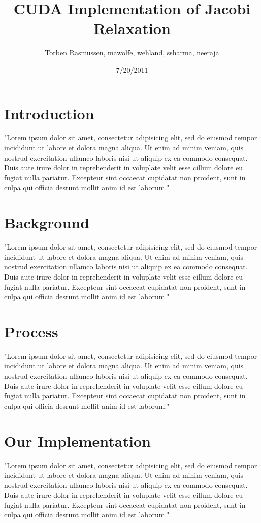 \documentclass[11pt, twocolumn]{article}
\title{CUDA Implementation of Jacobi Relaxation}
\author{Torben Rasmussen, mawolfe, wehland, ssharma, neeraja}
\date{7/20/2011}
\begin{document}
\maketitle

\section{Introduction}
"Lorem ipsum dolor sit amet, consectetur adipisicing elit, sed do eiusmod tempor incididunt ut labore et dolora magna aliqua.  Ut enim ad minim veniam, quis nostrud exercitation ullamco laboris nisi ut aliquip ex ea commodo consequat.  Duis aute irure dolor in reprehenderit in voluplate velit esse cillum dolore eu fugiat nulla pariatur.  Excepteur sint occaecat cupidatat non proident, sunt in culpa qui officia desrunt mollit anim id est laborum."

\section{Background}
"Lorem ipsum dolor sit amet, consectetur adipisicing elit, sed do eiusmod tempor incididunt ut labore et dolora magna aliqua.  Ut enim ad minim veniam, quis nostrud exercitation ullamco laboris nisi ut aliquip ex ea commodo consequat.  Duis aute irure dolor in reprehenderit in voluplate velit esse cillum dolore eu fugiat nulla pariatur.  Excepteur sint occaecat cupidatat non proident, sunt in culpa qui officia desrunt mollit anim id est laborum."

\section{Process}
"Lorem ipsum dolor sit amet, consectetur adipisicing elit, sed do eiusmod tempor incididunt ut labore et dolora magna aliqua.  Ut enim ad minim veniam, quis nostrud exercitation ullamco laboris nisi ut aliquip ex ea commodo consequat.  Duis aute irure dolor in reprehenderit in voluplate velit esse cillum dolore eu fugiat nulla pariatur.  Excepteur sint occaecat cupidatat non proident, sunt in culpa qui officia desrunt mollit anim id est laborum."

\section{Our Implementation}
"Lorem ipsum dolor sit amet, consectetur adipisicing elit, sed do eiusmod tempor incididunt ut labore et dolora magna aliqua.  Ut enim ad minim veniam, quis nostrud exercitation ullamco laboris nisi ut aliquip ex ea commodo consequat.  Duis aute irure dolor in reprehenderit in voluplate velit esse cillum dolore eu fugiat nulla pariatur.  Excepteur sint occaecat cupidatat non proident, sunt in culpa qui officia desrunt mollit anim id est laborum."
\end{document}
